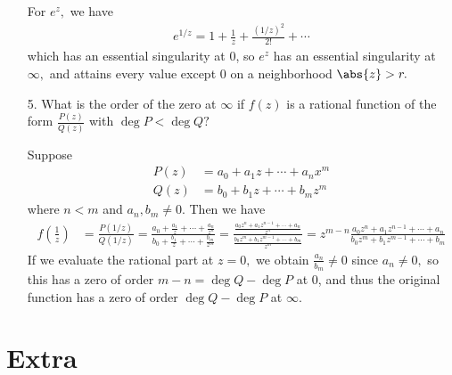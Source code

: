 \documentclass{article}
\begin{document}
\begin{itemize}
\begin{soln}
			For $e^z,$ we have
			\begin{align*}
				e^{1/z} = 1 + \frac{1}{z} + \frac{(1/z)^2}{2!} + \cdots 
			\end{align*}
			which has an essential singularity at 0, so $e^z$ has an essential singularity at $\infty,$ and attains every value except 0 on a neighborhood $\abs{z}>r.$
		\end{soln}

	\item[5.] What is the order of the zero at $\infty$ if $f(z)$ is a rational function of the form $\frac{P(z)}{Q(z)}$ with $\deg P<\deg Q?$
		\begin{soln}
			Suppose
			\begin{align*}
				P(z) &= a_0 + a_1z + \cdots + a_n x^m\\
				Q(z) &= b_0+b_1z+\cdots+b_mz^m
			\end{align*}
			where $n<m$ and $a_n, b_m\neq 0.$ Then we have
			\begin{align*}
				f\left( \frac{1}{z} \right) &= \frac{P(1/z)}{Q(1/z)} = \frac{a_0+\frac{a_1}{z} + \cdots + \frac{a_n}{z^n}}{b_0+\frac{b_1}{z} + \cdots + \frac{b_m}{z^m}} = \frac{\frac{a_0z^n+a_1z^{n-1} + \cdots + a_n}{z^n}}{\frac{b_0z^{m} + b_1z^{m-1} + \cdots + b_m}{z^m}} = z^{m-n} \frac{a_0z^n + a_1z^{n-1} + \cdots + a_n}{b_0z^m + b_1z^{m-1} + \cdots + b_m}
			\end{align*}
			If we evaluate the rational part at $z=0,$ we obtain $\frac{a_n}{b_m}\neq 0$ since $a_n\neq 0,$ so this has a zero of order $m-n=\deg Q-\deg P$ at 0, and thus the original function has a zero of order $\deg Q-\deg P$ at $\infty.$
		\end{soln}
		
\end{itemize}

\section*{Extra}
\end{document}
